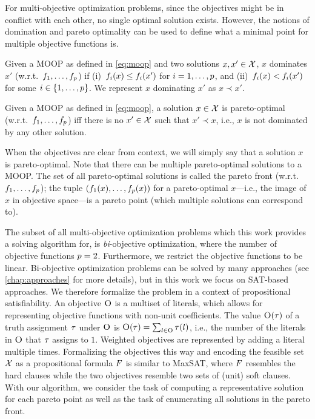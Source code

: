 For multi-objective optimization problems, since the objectives might be in conflict with each other, no single optimal solution exists.
However, the notions of domination and pareto optimality can be used to define what a minimal point for multiple objective functions is.
\begin{definition}
  Given a MOOP as defined in \cref{eq:moop} and two solutions $x,x' \in \mathcal{X}$, $x$ dominates $x'$ (w.r.t.\ $f_1,\dots,f_p$) if (i)~$f_i(x) \leq f_i(x')$ for $i=1,\dots,p$, and (ii)~$f_i(x) < f_i(x')$ for some $i\in\{1,\dots,p\}$.
  We represent $x$ dominating $x'$ as $x \prec x'$.
\end{definition}
\begin{definition}
  Given a MOOP as defined in \cref{eq:moop}, a solution $x \in \mathcal{X}$ is pareto-optimal (w.r.t.\ $f_1,\dots,f_p$) iff there is no $x' \in \mathcal{X}$ such that $x' \prec x$, i.e., $x$ is not dominated by any other solution.
\end{definition}
When the objectives are clear from context, we will simply say that a solution $x$ is pareto-optimal.
Note that there can be multiple pareto-optimal solutions to a MOOP.
The set of all pareto-optimal solutions is called the pareto front (w.r.t.\ $f_1,\dots,f_p$);
the tuple $(f_1(x),\dots,f_p(x))$ for a pareto-optimal $x$---i.e., the image of $x$ in objective space---is a pareto point (which multiple solutions can correspond to).

The subset of all multi-objective optimization problems which this work provides a solving algorithm for, is \emph{bi}-objective optimization, where the number of objective functions $p=2$.
Furthermore, we restrict the objective functions to be linear.
Bi-objective optimization problems can be solved by many approaches (see \cref{chap:approaches} for more details), but in this work we focus on SAT-based approaches.
We therefore formalize the problem in a context of propositional satisfiability.
An objective $\textsc{O}$ is a multiset of literals, which allows for representing objective functions with non-unit coefficients.
The value $\textsc{O}(\tau)$ of a truth assignment $\tau$ under $\textsc{O}$ is $\textsc{O}(\tau) = \sum_{l \in \textsc{O}} \tau(l)$, i.e., the number of the literals in $\textsc{O}$ that $\tau$ assigns to $1$. 
Weighted objectives are represented by adding a literal multiple times.
Formalizing the objectives this way and encoding the feasible set $\mathcal{X}$ as a propositional formula $F$ is similar to MaxSAT, where $F$ resembles the hard clauses while the two objectives resemble two sets of (unit) soft clauses.
With our algorithm, we consider the task of computing a representative solution for each pareto point as well as the task of enumerating all solutions in the pareto front.

